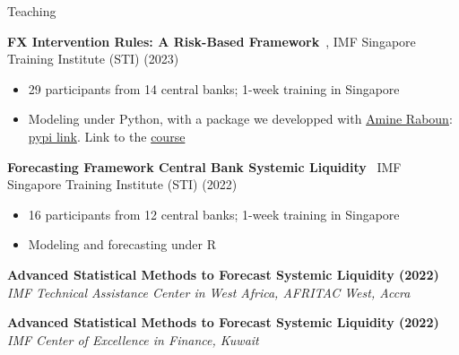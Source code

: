 \documentclass[usegeometry, 10pt, a4paper]{cv} %
\newcommand{\activite}[1]{\textbf{#1}\ }
\newcommand{\midreduce}{-0.5cm}
\begin{document}
\vspace{0.5cm}

\begin{rubriquetableau}[0.95\textwidth]{Teaching}\\
\vspace{-0.5cm}

\small    
\activite{FX Intervention Rules: A Risk-Based Framework}, IMF Singapore Training Institute (STI) (2023)\\
  \vspace{\midreduce}
  \begin{itemize}[label={}]
  \item \small{29 participants from 14 central banks; 1-week training in Singapore}    
  \item \small{Modeling under Python, with a package we developped with \href{https://amineraboun.github.io/}{Amine Raboun}: \href{https://pypi.org/project/varfxi/}{pypi link}. Link to the \href{https://romainlafarguette.github.io/fxinterventions/docs/index.html}{course}}
  \end{itemize}

  \vspace{0.3cm}

\small      
  \activite{Forecasting Framework Central Bank Systemic Liquidity} IMF Singapore Training Institute (STI) (2022)\\
  \vspace{\midreduce}
  \begin{itemize}[label={}]
  \item \small{16 participants from 12 central banks; 1-week training in Singapore}
  \item \small{Modeling and forecasting under R}    
  \end{itemize}

\small
\activite{Advanced Statistical Methods to Forecast Systemic Liquidity (2022)} \\
\hspace{0.6cm} \small{\emph{IMF Technical Assistance Center in West Africa, AFRITAC West, Accra}}
\vspace{0.3cm}

\small
\activite{Advanced Statistical Methods to Forecast Systemic Liquidity (2022)} \\
\hspace{0.6cm} \small{\emph{IMF Center of Excellence in Finance, Kuwait}}
\vspace{0.3cm}


\end{rubriquetableau}
\end{document}
